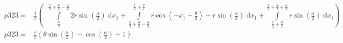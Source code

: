 \begin{align}
    p323 =&\frac{1}{\pi} \left(\;\;\int\limits_{\frac{\pi}{2}}^{\frac{\pi}{2} + \frac{\theta}{2} - \frac{\alpha}{2}}2 r \sin{\left (\frac{\alpha}{2} \right )}\;\mathrm{d}x_{1}+\int\limits_{\frac{\pi}{2} + \frac{\theta}{2} - \frac{\alpha}{2}}^{\frac{\pi}{2} + \frac{\theta}{2}}r \cos{\left (- x_{1} + \frac{\theta}{2} \right )} + r \sin{\left (\frac{\alpha}{2} \right )}\;\mathrm{d}x_{1}+\int\limits_{\frac{\pi}{2} + \frac{\theta}{2}}^{\frac{\pi}{2} + \frac{\theta}{2} + \frac{\alpha}{2}}r \sin{\left (\frac{\alpha}{2} \right )}\;\mathrm{d}x_{1}\right)\label{p323Def}\\
    p323 =& \frac{r}{\pi} \left(\theta \sin{\left (\frac{\alpha}{2} \right )} - \cos{\left (\frac{\alpha}{2} \right )} + 1\right)\label{p323Sln}
\end{align}